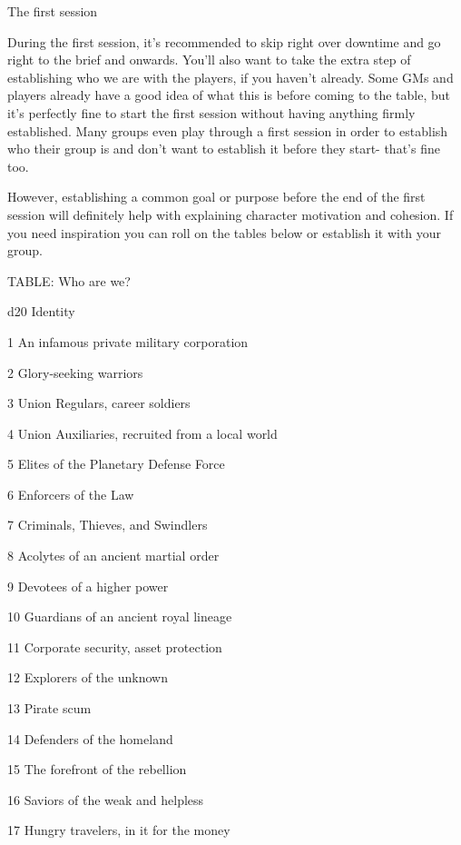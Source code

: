                                                 The first session


During the first session, it’s recommended to skip right over downtime and go right to the brief
and onwards. You’ll also want to take the extra step of establishing who we are with the players,
if you haven’t already. Some GMs and players already have a good idea of what this is before
coming to the table, but it’s perfectly fine to start the first session without having anything firmly
established. Many groups even play through a first session in order to establish who their group
is and don’t want to establish it before they start- that’s fine too.


However, establishing a common goal or purpose before the end of the first session will definitely
help with explaining character motivation and cohesion. If you need inspiration you can roll on
the tables below or establish it with your group.


TABLE: Who are we?





 d20       Identity

 1         An infamous private military corporation

 2         Glory-seeking warriors

 3         Union Regulars, career soldiers

 4         Union Auxiliaries, recruited from a local world

 5         Elites of the Planetary Defense Force

 6         Enforcers of the Law

 7         Criminals, Thieves, and Swindlers

 8         Acolytes of an ancient martial order

 9         Devotees of a higher power

  10       Guardians of an ancient royal lineage

  11       Corporate security, asset protection

  12       Explorers of the unknown

  13       Pirate scum

  14       Defenders of the homeland

  15       The forefront of the rebellion

  16       Saviors of the weak and helpless

  17       Hungry travelers, in it for the money

